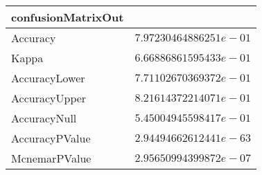 \begin{table}[!tbp]
\begin{center}
\begin{tabular}{lr}
\hline\hline
\multicolumn{1}{l}{confusionMatrixOut}&\multicolumn{1}{c}{}\tabularnewline
\hline
Accuracy&$7.97230464886251e-01$\tabularnewline
Kappa&$6.66886861595433e-01$\tabularnewline
AccuracyLower&$7.71102670369372e-01$\tabularnewline
AccuracyUpper&$8.21614372214071e-01$\tabularnewline
AccuracyNull&$5.45004945598417e-01$\tabularnewline
AccuracyPValue&$2.94494662612441e-63$\tabularnewline
McnemarPValue&$2.95650994399872e-07$\tabularnewline
\hline
\end{tabular}\end{center}

\end{table}
